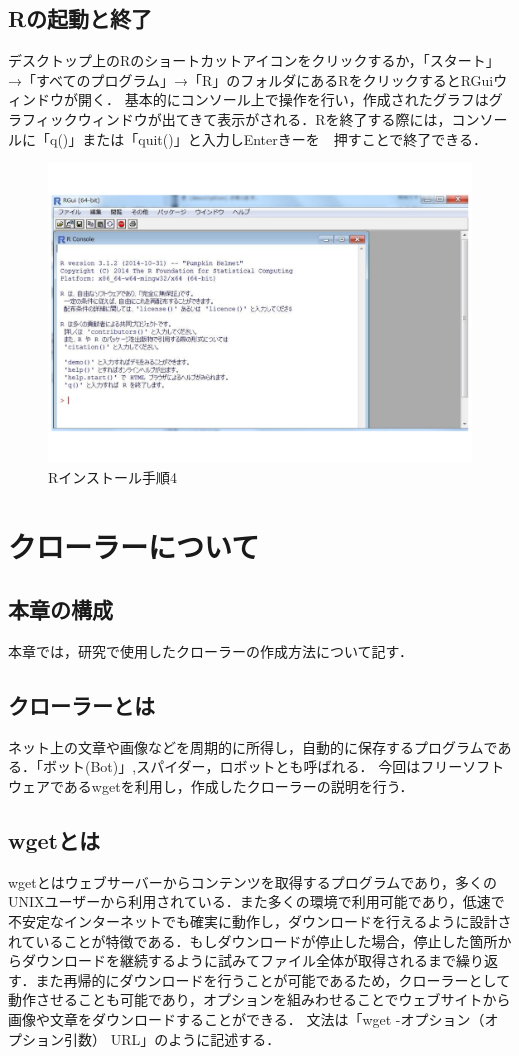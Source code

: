 \section{Rの起動と終了}
デスクトップ上のRのショートカットアイコンをクリックするか，「スタート」→「すべてのプログラム」→「R」のフォルダにあるRをクリックするとRGuiウィンドウが開く．
基本的にコンソール上で操作を行い，作成されたグラフはグラフィックウィンドウが出てきて表示がされる．Rを終了する際には，コンソールに「q()」または「quit()」と入力しEnterきーを　押すことで終了できる．
\begin{figure}[H]
\centering
\includegraphics[width=13cm]{figure2.pdf}
\caption{Rインストール手順4}\label{sannp}
\end{figure}

\chapter{クローラーについて}
\section{本章の構成}
本章では，研究で使用したクローラーの作成方法について記す．

\section{クローラーとは}
ネット上の文章や画像などを周期的に所得し，自動的に保存するプログラムである．「ボット(Bot)」,スパイダー，ロボットとも呼ばれる．
今回はフリーソフトウェアであるwgetを利用し，作成したクローラーの説明を行う．

\section{wgetとは}
wgetとはウェブサーバーからコンテンツを取得するプログラムであり，多くのUNIXユーザーから利用されている．また多くの環境で利用可能であり，低速で不安定なインターネットでも確実に動作し，ダウンロードを行えるように設計されていることが特徴である．もしダウンロードが停止した場合，停止した箇所からダウンロードを継続するように試みてファイル全体が取得されるまで繰り返す．また再帰的にダウンロードを行うことが可能であるため，クローラーとして動作させることも可能であり，オプションを組みわせることでウェブサイトから画像や文章をダウンロードすることができる．
文法は「wget -オプション（オプション引数） URL」のように記述する．

